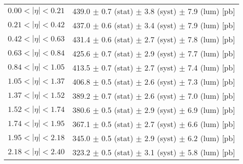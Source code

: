 \begin{tabular}{lc}
\hline
$0.00 < |\eta| <0.21$          & 439.0 $\pm$ 0.7 (stat) $\pm$ 3.8 (syst) $\pm$ 7.9 (lum) [pb]  \\
$0.21 < |\eta| <0.42$          & 437.0 $\pm$ 0.6 (stat) $\pm$ 3.4 (syst) $\pm$ 7.9 (lum) [pb]  \\
$0.42 < |\eta| <0.63$          & 431.4 $\pm$ 0.6 (stat) $\pm$ 2.7 (syst) $\pm$ 7.8 (lum) [pb]  \\
$0.63 < |\eta| <0.84$          & 425.6 $\pm$ 0.7 (stat) $\pm$ 2.9 (syst) $\pm$ 7.7 (lum) [pb]  \\
$0.84 < |\eta| <1.05$          & 413.5 $\pm$ 0.7 (stat) $\pm$ 2.7 (syst) $\pm$ 7.4 (lum) [pb]  \\
$1.05 < |\eta| <1.37$          & 406.8 $\pm$ 0.5 (stat) $\pm$ 2.6 (syst) $\pm$ 7.3 (lum) [pb]  \\
$1.37 < |\eta| <1.52$          & 389.2 $\pm$ 0.7 (stat) $\pm$ 2.6 (syst) $\pm$ 7.0 (lum) [pb]  \\
$1.52 < |\eta| <1.74$          & 380.6 $\pm$ 0.5 (stat) $\pm$ 2.9 (syst) $\pm$ 6.9 (lum) [pb]  \\
$1.74 < |\eta| <1.95$          & 367.1 $\pm$ 0.5 (stat) $\pm$ 2.7 (syst) $\pm$ 6.6 (lum) [pb]  \\
$1.95 < |\eta| <2.18$          & 345.0 $\pm$ 0.5 (stat) $\pm$ 2.9 (syst) $\pm$ 6.2 (lum) [pb]  \\
$2.18 < |\eta| <2.40$          & 323.2 $\pm$ 0.5 (stat) $\pm$ 3.1 (syst) $\pm$ 5.8 (lum) [pb]  \\
\hline
\end{tabular}
